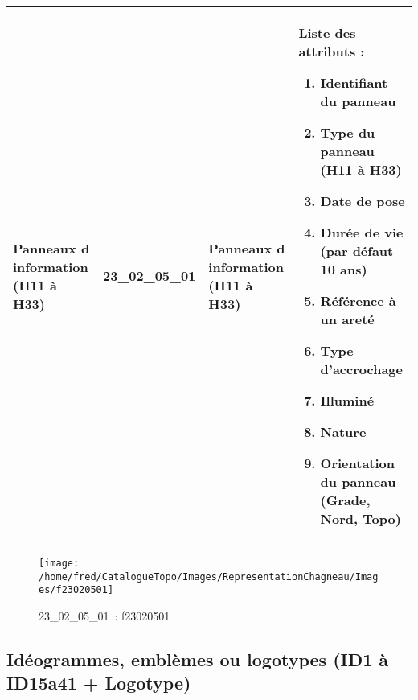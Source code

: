 \documentclass[12pt,titlepage]{book}
\begin{document}
\renewcommand{\arraystretch}{1.2}
\begin{supertabular}{|p{10cm}|c|p{13cm}|p{12cm}|}
 Panneaux d information (H11 à H33) & 23\_02\_05\_01 & Panneaux d information (H11 à H33) & Liste des attributs :
\begin{enumerate}
  \item Identifiant du panneau  \item Type du panneau (H11 à H33)  \item Date de pose  \item Durée de vie (par défaut 10 ans)  \item Référence à un areté  \item Type d'accrochage  \item Illuminé  \item Nature  \item Orientation du panneau (Grade, Nord, Topo)\end{enumerate}
\\
\hline
\end{supertabular}
\begin{figure}[h!]
  \hfill         %
  \begin{minipage}[t]{3cm}
    \begin{center}
      \texttt{[image: /home/fred/CatalogueTopo/Images/RepresentationChagneau/Images/f23020501]}
      \caption[~23\_02\_05\_01]{\small{23\_02\_05\_01~:} \tiny{f23020501}}\label{f23020501}
    \end{center}
  \end{minipage}
\end{figure}


\subsection{Idéogrammes, emblèmes ou logotypes (ID1 à ID15a41 + Logotype)}
\noindent
\vspace{\baselineskip}
\end{document}
